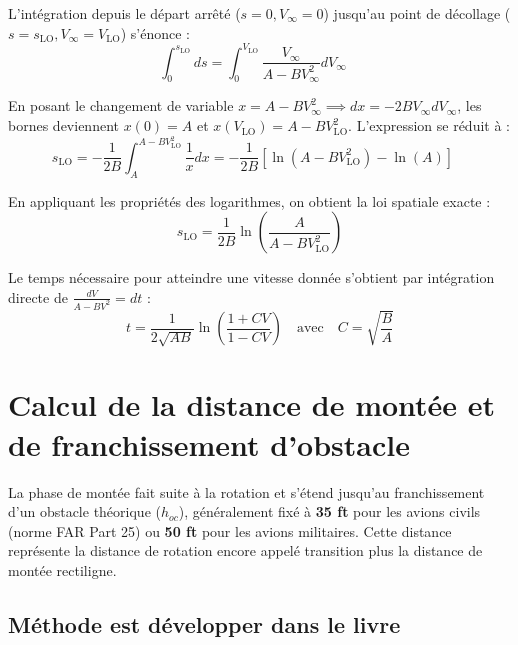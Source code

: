 			L'intégration depuis le départ arrêté ($s=0, V_\infty=0$) jusqu'au point de décollage ($s=s_{\text{LO}}, V_\infty=V_{\text{LO}}$) s'énonce :
			\begin{equation}
				\int_{0}^{s_{\text{LO}}} ds = \int_{0}^{V_{\text{LO}}} \frac{V_\infty}{A - BV_\infty^2} dV_\infty \quad 
			\end{equation}
			
			En posant le changement de variable $x = A - BV_\infty^2 \implies dx = -2BV_\infty dV_\infty$, les bornes deviennent $x(0) = A$ et $x(V_{\text{LO}}) = A - BV_{\text{LO}}^2$. L'expression se réduit à :
			\begin{equation}
				s_{\text{LO}} = -\frac{1}{2B} \int_{A}^{A - BV_{\text{LO}}^2} \frac{1}{x} dx = -\frac{1}{2B} \left[\ln\left(A - BV_{\text{LO}}^2\right) - \ln(A)\right] \quad 
			\end{equation}
			
			En appliquant les propriétés des logarithmes, on obtient la loi spatiale exacte :
			\begin{equation}
				s_{\text{LO}} = \frac{1}{2B}\ln\left(\frac{A}{A - BV_{\text{LO}}^2}\right)
			\end{equation}
			
			Le temps nécessaire pour atteindre une vitesse donnée s'obtient par intégration directe de $\frac{dV}{A-BV^2} = dt$ :
			\begin{equation}
				t = \frac{1}{2\sqrt{AB}}\ln\left(\frac{1 + CV}{1 - CV}\right) \quad \text{avec} \quad C = \sqrt{\frac{B}{A}} 
			\end{equation}
			
			
 
 		\section{Calcul de la distance de montée et de franchissement d'obstacle}
 		
 		La phase de montée fait suite à la rotation et s'étend jusqu'au franchissement 
 		d'un obstacle théorique ($h_{oc}$), généralement fixé à \textbf{35 ft} pour les 
 		avions civils (norme FAR Part 25) ou \textbf{50 ft} pour les avions militaires.
 		Cette distance représente la distance de rotation encore appelé transition plus la distance de montée rectiligne.
 		
 		\subsection{Méthode est développer dans le livre \cite{War:09}}
